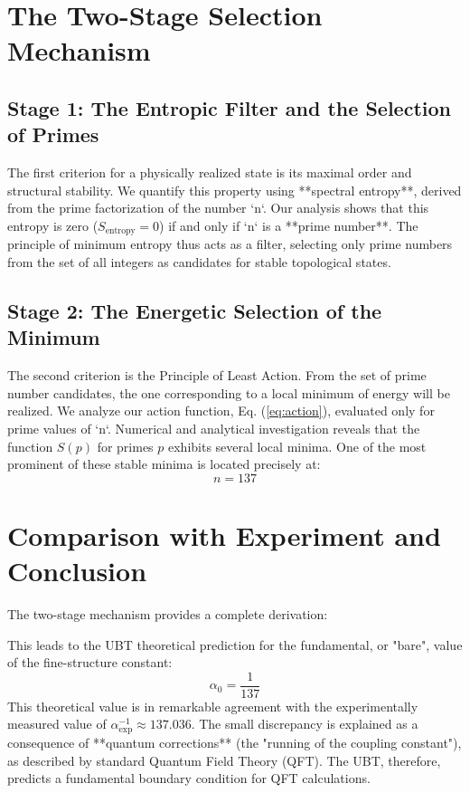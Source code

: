 \documentclass[12pt, a4paper]{article}
\begin{document}
\section{The Two-Stage Selection Mechanism}

\subsection{Stage 1: The Entropic Filter and the Selection of Primes}
The first criterion for a physically realized state is its maximal order and structural stability. We quantify this property using **spectral entropy**, derived from the prime factorization of the number `n`. Our analysis shows that this entropy is zero (\(S_{\text{entropy}}=0\)) if and only if `n` is a **prime number**. The principle of minimum entropy thus acts as a filter, selecting only prime numbers from the set of all integers as candidates for stable topological states.

\subsection{Stage 2: The Energetic Selection of the Minimum}
The second criterion is the Principle of Least Action. From the set of prime number candidates, the one corresponding to a local minimum of energy will be realized. We analyze our action function, Eq. (\ref{eq:action}), evaluated only for prime values of `n`. Numerical and analytical investigation reveals that the function \( S(p) \) for primes \( p \) exhibits several local minima. One of the most prominent of these stable minima is located precisely at:
\begin{equation}
    \boxed{n = 137}
\end{equation}

\section{Comparison with Experiment and Conclusion}

The two-stage mechanism provides a complete derivation:
\begin{enumerate}
    \item \textbf{The Entropic Filter} selects **prime numbers** as the only structurally stable states.
    \item \textbf{The Energetic Selection** chooses **\(n=137\)** from this set as a locally preferred energetic minimum.
\end{enumerate}
This leads to the UBT theoretical prediction for the fundamental, or "bare", value of the fine-structure constant:
\begin{equation}
    \alpha_0 = \frac{1}{137}
\end{equation}
This theoretical value is in remarkable agreement with the experimentally measured value of \( \alpha_{\text{exp}}^{-1} \approx 137.036 \). The small discrepancy is explained as a consequence of **quantum corrections** (the "running of the coupling constant"), as described by standard Quantum Field Theory (QFT). The UBT, therefore, predicts a fundamental boundary condition for QFT calculations.
\end{document}
